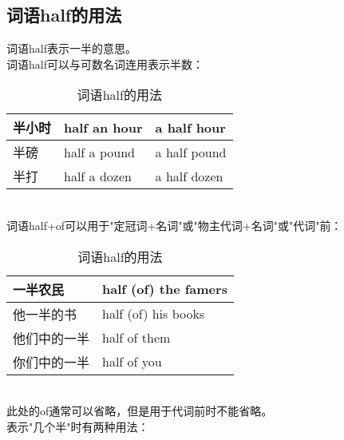 \documentclass[UTF8]{ctexart}
\newcommand{\littf}[1]{{\hspace{3pt}\ttfamily #1}}
\begin{document}
\subsection{词语\littf{half}的用法}
    词语\littf{half}表示一半的意思。\\[3mm]
    词语\littf{half}可以与可数名词连用表示半数：\vspace{5pt}
    \begin{table}[h!]
        \begin{center}
            \ttfamily
            \begin{tabular}{p{80pt}|p{100pt}|p{100pt}}
                \hline
                半小时&half an hour&a half hour\\ \hline
                半磅&half a pound&a half pound\\ \hline
                半打&half a dozen&a half dozen\\ \hline
            \end{tabular}
            \rmfamily
            \caption{词语\littf{half}的用法}
        \end{center}
    \end{table}\\
    词语\littf{half+of}可以用于\littf{"\hspace{0pt}定冠词+名词"}或\littf{"\hspace{0pt}物主代词+名词"}或\littf{"\hspace{0pt}代词"}前：\vspace{5pt}
    \begin{table}[h!]
        \begin{center}
            \ttfamily
            \begin{tabular}{p{80pt}|p{140pt}}
                \hline
                一半农民&half (of) the famers\\ \hline
                他一半的书&half (of) his books\\ \hline
                他们中的一半&half of them\\ \hline
                你们中的一半&half of you\\ \hline
            \end{tabular}
            \rmfamily
            \caption{词语\littf{half}的用法}
        \end{center}
    \end{table}\\
    此处的\littf{of}通常可以省略，但是用于代词前时不能省略。\\[8mm]
    表示\littf{"\hspace{0pt}几个半"}时有两种用法：\vspace{5pt}
\end{document}
